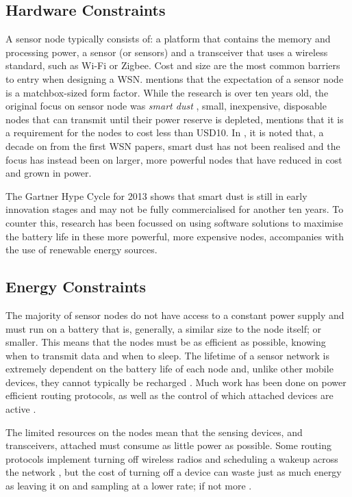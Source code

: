 \subsection{Hardware Constraints}
	A sensor node typically consists of: a platform that contains the memory and processing power,  a sensor (or sensors) and a transceiver that uses a wireless standard, such as Wi-Fi or Zigbee. Cost and size are the most common barriers to entry when designing a WSN. \cite{Intanagonwiwat2000} mentions that the expectation of a sensor node is a matchbox-sized form factor. While the research is over ten years old, the original focus on sensor node was \textit{smart dust} \cite{Kahn}, small, inexpensive, disposable nodes that can transmit until their power reserve is depleted, \cite{Akyildiz2002a} mentions that it is a requirement for the nodes to cost less than USD10. In \cite{Corke2010a}, it is noted that, a decade on from the first WSN papers, smart dust has not been realised and the focus has instead been on larger, more powerful nodes that have reduced in cost and grown in power. 

	The Gartner Hype Cycle for 2013 \cite{gartner2013} shows that smart dust is still in early innovation stages and may not be fully commercialised for another ten years. To counter this, research has been focussed on using software solutions to maximise the battery life in these more powerful, more expensive nodes, accompanies with the use of renewable energy sources.

\subsection{Energy Constraints}
	 The majority of sensor nodes do not have access to a constant power supply and must run on a battery that is, generally, a similar size to the node itself; or smaller. This means that the nodes must be as efficient as possible, knowing when to transmit data and when to sleep. The lifetime of a sensor network is extremely dependent on the battery life of each node and, unlike other mobile devices, they cannot typically be recharged \cite{Akyildiz2002}. Much work has been done on power efficient routing protocols, as well as the control of which attached devices are active \cite{Segal2010a, Hempstead2005, Schurgers}. 

	The limited resources on the nodes mean that the sensing devices, and transceivers, attached must consume as little power as possible. Some routing protocols implement turning off wireless radios and scheduling a wakeup across the network \cite{Vaidya2004}, but the cost of turning off a device can waste just as much energy as leaving it on and sampling at a lower rate; if not more \cite{Estrin2001}.


